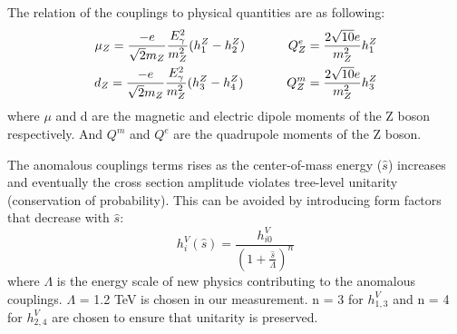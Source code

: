 \documentclass[12pt,twoside,letterpaper]{article}
\begin{document}
The relation of the couplings to physical quantities are as following\cite{nTGC}:
    \begin{eqnarray*}
     \mu_Z = \frac{-e}{\sqrt{2}m_Z} \frac{E^2_{\gamma}}{m^2_Z}(h_1^Z - h_2^Z) 
	 \hspace{1.2cm} Q^e_Z = \frac{2\sqrt{10}e}{m^2_Z}h_1^Z \\
       d_Z = \frac{-e}{\sqrt{2}m_Z} \frac{E^2_{\gamma}}{m^2_Z}(h_3^Z - h_4^Z) 
	   \hspace{1.2cm} Q^m_Z = \frac{2\sqrt{10}e}{m^2_Z}h_3^Z 
    \end{eqnarray*}
where $\mu$ and d are the magnetic and electric dipole moments of the
Z boson respectively. And $Q^m$ and $Q^e$ are the quadrupole moments
of the Z boson. 

The anomalous couplings terms rises as the center-of-mass
energy ($\hat{s}$) increases and eventually the cross section
amplitude violates tree-level unitarity (conservation of probability). This can be avoided by introducing form factors that decrease with $\hat{s}$:
\begin{equation}
h_i^V (\hat{s} ) = \frac{h_{i0}^V}{(1 + \frac{\hat{s}}{\Lambda})^n}
\end{equation}
where $\Lambda$ is the energy scale of new physics contributing to the
anomalous couplings. $\Lambda$ = 1.2 TeV is chosen in our measurement. n = 3 for $h_{1,3}^V$ and n = 4
for $h_{2,4}^V$ are chosen to ensure that unitarity is preserved\cite{BaurPRD47}. 

\end{document}
